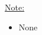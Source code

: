 \noindent\underline{Note:}
\begin{itemize}
\item[~] None
\end{itemize}

\begin{figure}[htb]
\begin{center}
\end{center}
\end{figure}
